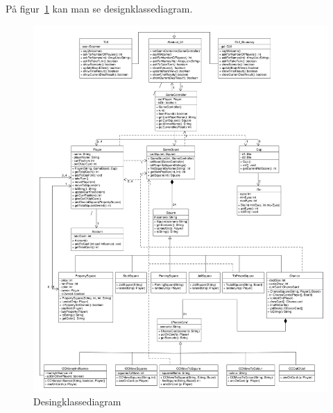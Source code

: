 \documentclass[class=article, crop=false]{standalone}
\begin{document}
På figur~\ref{fig:DKD} kan man se designklassediagram.
    \begin{figure}[H]
        \centering
        \includegraphics[scale = 0.2]{diagrams/DKD.pdf}
        \caption{Desingklassediagram}\label{fig:DKD}
    \end{figure}
\end{document}
